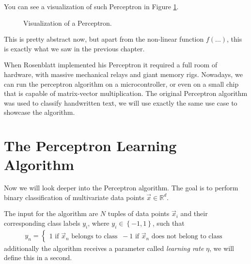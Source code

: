 You can see a visualization of such Perceptron in Figure \ref{fig:perceptron}.

\begin{figure}[h]
  \centering
  \caption{Visualization of a Perceptron.}
  \label{fig:perceptron}
\end{figure}
This is pretty abstract now, but apart from the non-linear function $f(...)$, this is exactly what we saw in the previous chapter.

When Rosenblatt implemented his Perceptron it required a full room of hardware, with massive mechanical relays and giant memory rigs.
Nowadays, we can run the perceptron algorithm on a microcontroller, or even on a small chip that is capable of matrix-vector multiplication.
The original Perceptron algorithm was used to classify handwritten text, we will use exactly the same use case to showcase the algorithm.

\section{The Perceptron Learning Algorithm}
Now we will look deeper into the Perceptron algorithm.
The goal is to perform binary classification of multivariate data points $\vec{x} \in \mathbb{R}^d$.

The input for the algorithm are $N$ tuples of data points $\vec{x}_i$ and their corresponding class labels $y_i$, where $y_i \in \left\{-1, 1\right\}$, such that
\begin{align}
  y_n = \left\{\begin{matrix}
    1 \text{ if } \vec{x}_n \text{ belongs to class }\
    -1 \text{ if } \vec{x}_n \text{ does not belong to class }
  \end{matrix}\right.
\end{align}
additionally the algorithm receives a parameter called \textit{learning rate} $\eta$, we will define this in a second.


